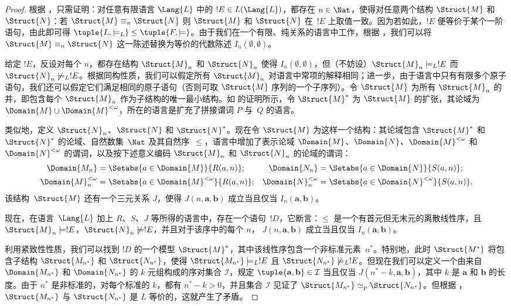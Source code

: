 \documentclass[../../../include/open-logic-section]{subfiles}
\begin{document}
\begin{proof}
根据 ，只需证明：对任意有限语言 $\Lang{L}$ 中的 $!E
\in L(\Lang{L})$，都存在 $n \in \Nat$，使得对任意两个结构 $\Struct{M}$ 和~$\Struct{N}$：若
$\Struct{M} \equiv_n \Struct{N}$ 则 $\Struct{M}$ 和 $\Struct{N}$
在~$!E$ 上取值一致。因为若如此，$!E$ 便等价于某个一阶语句，由此即可得
$\tuple{L, \models_L} \le \tuple{F, \models}$。由于我们在一个有限、纯关系的语言中工作，根据 ，我们可以将
$\Struct{M} \equiv_n \Struct{N}$ 这一陈述替换为等价的代数陈述 $I_n(\emptyset,\emptyset)$。

给定 $!E$，反设对每个 $n$，都存在结构 $\Struct{M}_n$ 和 $\Struct{N}_n$ 使得
$I_n(\emptyset, \emptyset)$，但（不妨设）$\Struct{M}_n \models_L !E$
而 $\Struct{N}_n \not\models_L !E$。根据同构性质，我们可以假定所有 $\Struct{M}_n$ 对语言中常项的解释相同；进一步，由于语言中只有有限多个原子语句，我们还可以假定它们满足相同的原子语句（否则可取 $\Struct{M}$ 序列的一个子序列）。令 $\Struct{M}$ 为所有 $\Struct{M}_n$ 的并，即包含每个 $\Struct{M}_n$ 作为子结构的唯一最小结构。如  的证明所示，令 $\Struct{M}^*$ 为 $\Struct{M}$ 的扩张，其论域为
$\Domain{M} \cup
\Domain{M}^{<\omega}$，所在的语言是扩充了拼接谓词 $P$ 与~$Q$ 的语言。

类似地，定义 $\Struct{N}_n$、$\Struct{N}$ 和 $\Struct{N}^*$。现在令 $\Struct{M}$ 为这样一个结构：其论域包含 $\Struct{M}^*$ 和 $\Struct{N}^*$ 的论域、自然数集~$\Nat$ 及其自然序~$\le$，语言中增加了表示论域
$\Domain{M}$、$\Domain{N}$、$\Domain{M}^{<\omega}$ 和
$\Domain{N}^{<\omega}$ 的谓词，以及按下述意义编码 $\Struct{M}_n$ 和 $\Struct{N}_n$ 的论域的谓词：
\begin{align*}
  \Domain{M_n} & = \Setabs{a \in \Domain{M}}{R(a, n)}; &
  \Domain{N_n} & = \Setabs{a \in \Domain{N}}{S(a,n)}; \\
  \Domain{M}^{<\omega}_n & = \Setabs{a \in \Domain{M}^{<\omega}}{R(a,n)}; &
  \Domain{N}^{<\omega}_n & = \Setabs{a \in \Domain{N}^{<\omega}}{S(a,n)}.
\end{align*}
该结构~$\Struct{M}$ 还有一个三元关系 $J$，使得
$J(n, \mathbf{a}, \mathbf{b})$ 成立当且仅当
$I_n(\mathbf{a}, \mathbf{b})$。

现在，在语言~$\Lang{L}$ 加上 $R$、$S$、$J$ 等所得的语言中，存在一个语句~$!D$，它断言：$\le$ 是一个有首元但无末元的离散线性序，且 $\Struct{M}_n \models
!E$，$\Struct{N}_n \not\models !E$，并且对于该序中的每个 $n$，
$J(n, \mathbf{a}, \mathbf{b})$ 成立当且仅当
$I_n(\mathbf{a}, \mathbf{b})$。

利用紧致性性质，我们可以找到 $!D$ 的一个模型 $\Struct{M}^*$，其中该线性序包含一个非标准元素~$n^*$。特别地，此时 $\Struct{M^*}$ 将包含子结构
$\Struct{M_{n^*}}$ 和 $\Struct{N_{n^*}}$，使得 $\Struct{M_{n^*}}
\models_L !E$ 且 $\Struct{N_{n^*}} \not\models_L !E$。但现在我们可以定义一个由来自
$\Domain{M_{n^*}}$ 和 $\Domain{N_{n^*}}$ 的 $k$ 元组构成的序对集合 $\mathcal{I}$，规定
$\tuple{\mathbf{a}, \mathbf{b}} \in \mathcal{I}$ 当且仅当
$J(n^*-k, \mathbf{a}, \mathbf{b})$，其中 $k$ 是
$\mathbf{a}$ 和 $\mathbf{b}$ 的长度。由于 $n^*$ 是非标准的，对每个标准的 $k$，都有 $n^* - k >0$，并且集合 $\mathcal{I}$ 见证了
$\Struct{M_{n^*}} \simeq_p
\Struct{N_{n^*}}$。但根据 ，
$\Struct{M_{n^*}}$ 与 $\Struct{N_{n^*}}$ 是 $L$ 等价的，这就产生了矛盾。
\end{proof}
\end{document}
